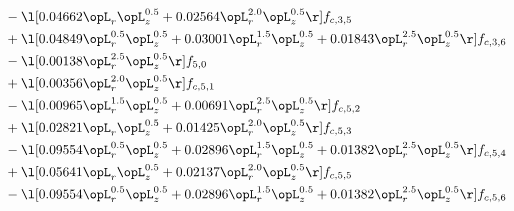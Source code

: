 \begin{alignat}{2}
& - \l[  0.04662 \opL_r \opL_z^{0.5} +  0.02564 \opL_r^{2.0} \opL_z^{0.5}  \r] f_{c,3,5} \nonumber \\ 
& + \l[  0.04849 \opL_r^{0.5} \opL_z^{0.5} +  0.03001 \opL_r^{1.5} \opL_z^{0.5} +  0.01843 \opL_r^{2.5} \opL_z^{0.5}  \r] f_{c,3,6} \nonumber \\ 
& - \l[  0.00138 \opL_r^{2.5} \opL_z^{0.5}  \r] f_{5,0} \nonumber \\ 
& + \l[  0.00356 \opL_r^{2.0} \opL_z^{0.5}  \r] f_{c,5,1} \nonumber \\ 
& - \l[  0.00965 \opL_r^{1.5} \opL_z^{0.5} +  0.00691 \opL_r^{2.5} \opL_z^{0.5}  \r] f_{c,5,2} \nonumber \\ 
& + \l[  0.02821 \opL_r \opL_z^{0.5} +  0.01425 \opL_r^{2.0} \opL_z^{0.5}  \r] f_{c,5,3} \nonumber \\ 
& - \l[  0.09554 \opL_r^{0.5} \opL_z^{0.5} +  0.02896 \opL_r^{1.5} \opL_z^{0.5} +  0.01382 \opL_r^{2.5} \opL_z^{0.5}  \r] f_{c,5,4} \nonumber \\ 
& + \l[  0.05641 \opL_r \opL_z^{0.5} +  0.02137 \opL_r^{2.0} \opL_z^{0.5}  \r] f_{c,5,5} \nonumber \\ 
& - \l[  0.09554 \opL_r^{0.5} \opL_z^{0.5} +  0.02896 \opL_r^{1.5} \opL_z^{0.5} +  0.01382 \opL_r^{2.5} \opL_z^{0.5}  \r] f_{c,5,6} \nonumber \\ 
\end{alignat} 


